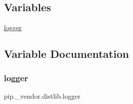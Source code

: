 \subsection*{Variables}
\begin{DoxyCompactItemize}
\item 
\hyperlink{namespacepip_1_1__vendor_1_1distlib_a125e21a0644bed21ada612dbd41579ce}{logger}
\end{DoxyCompactItemize}


\subsection{Variable Documentation}
\mbox{\label{namespacepip_1_1__vendor_1_1distlib_a125e21a0644bed21ada612dbd41579ce}} 
\subsubsection{\texorpdfstring{logger}{logger}}
{\footnotesize\ttfamily pip.\+\_\+vendor.\+distlib.\+logger}

